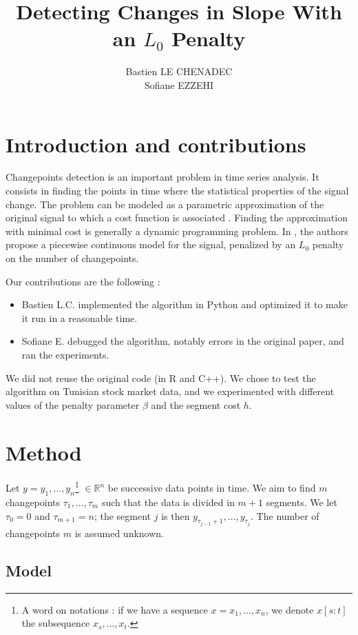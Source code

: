 \documentclass[11pt]{article}
\title{Detecting Changes in Slope With an $L_0$ Penalty}
\author{
Bastien LE CHENADEC \email{bastien.le-chenadec@eleves.enpc.fr} \\ %
Sofiane EZZEHI \email{sofiane.ezzehi@eleves.enpc.fr} %
}
\begin{document}
\maketitle
\section{Introduction and contributions}

Changepoints detection is an important problem in time series analysis. It consists in finding the points in time where the statistical properties of the signal change. The problem can be modeled as a parametric approximation of the original signal to which a cost function is associated \cite{Truong_Oudre_Vayatis_2020}. Finding the approximation with minimal cost is generally a dynamic programming problem. In \cite{main_article}, the authors propose a piecewise continuous model for the signal, penalized by an $L_0$ penalty on the number of changepoints.

Our contributions are the following :
\begin{itemize}
    \item Bastien L.C. implemented the algorithm in Python and optimized it to make it run in a reasonable time.
    \item Sofiane E. debugged the algorithm, notably errors in the original paper, and ran the experiments.
\end{itemize}
We did not reuse the original code (in R and C++). We chose to test the algorithm on Tunisian stock market data, and we experimented with different values of the penalty parameter $\beta$ and the segment cost $h$.

\section{Method}

Let $y=y_1, \dots, y_n$\footnote{A word on notations : if we have a sequence $x=x_1,\dots,x_n$, we denote $x[s:t]$ the subsequence $x_s,\dots,x_t$.} $\in \mathbb{R}^n$ be successive data points in time. We aim to find $m$ changepoints $\tau_1,\dots,\tau_m$ such that the data is divided in $m+1$ segments. We let $\tau_0=0$ and $\tau_{m+1}=n$; the segment $j$ is then $y_{\tau_{j-1}+1},\dots,y_{\tau_j}$. The number of changepoints $m$ is assumed unknown.

\subsection{Model}
\end{document}
